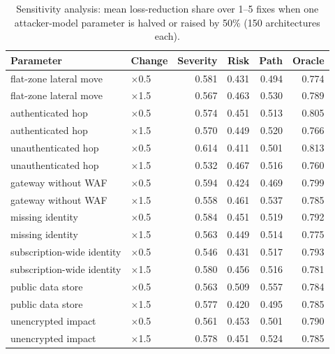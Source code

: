 \begin{table}[t]
\centering
\caption{Sensitivity analysis: mean loss-reduction share over 1--5 fixes when one attacker-model parameter is halved or raised by 50\% (150 architectures each).}
\label{tab:sens}
\small
\setlength{\tabcolsep}{4pt}
\begin{tabular}{llrrrr}
\toprule
Parameter & Change & Severity & Risk & Path & Oracle \\
\midrule
flat-zone lateral move & $\times$0.5 & 0.581 & 0.431 & 0.494 & 0.774 \\
flat-zone lateral move & $\times$1.5 & 0.567 & 0.463 & 0.530 & 0.789 \\
authenticated hop & $\times$0.5 & 0.574 & 0.451 & 0.513 & 0.805 \\
authenticated hop & $\times$1.5 & 0.570 & 0.449 & 0.520 & 0.766 \\
unauthenticated hop & $\times$0.5 & 0.614 & 0.411 & 0.501 & 0.813 \\
unauthenticated hop & $\times$1.5 & 0.532 & 0.467 & 0.516 & 0.760 \\
gateway without WAF & $\times$0.5 & 0.594 & 0.424 & 0.469 & 0.799 \\
gateway without WAF & $\times$1.5 & 0.558 & 0.461 & 0.537 & 0.785 \\
missing identity & $\times$0.5 & 0.584 & 0.451 & 0.519 & 0.792 \\
missing identity & $\times$1.5 & 0.563 & 0.449 & 0.514 & 0.775 \\
subscription-wide identity & $\times$0.5 & 0.546 & 0.431 & 0.517 & 0.793 \\
subscription-wide identity & $\times$1.5 & 0.580 & 0.456 & 0.516 & 0.781 \\
public data store & $\times$0.5 & 0.563 & 0.509 & 0.557 & 0.784 \\
public data store & $\times$1.5 & 0.577 & 0.420 & 0.495 & 0.785 \\
unencrypted impact & $\times$0.5 & 0.561 & 0.453 & 0.501 & 0.790 \\
unencrypted impact & $\times$1.5 & 0.578 & 0.451 & 0.524 & 0.785 \\
\bottomrule
\end{tabular}
\end{table}

